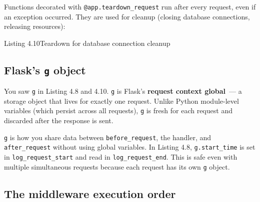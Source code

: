 Functions decorated with \texttt{@app.teardown\_request} run after every request, even if an exception occurred. They are used for cleanup (closing database connections, releasing resources):

\begin{codeboxcap}[short]{\textcolor{accent}{Listing 4.10}\enspace Teardown for database connection cleanup}

\begin{Shaded}
\begin{Highlighting}[]
\OperatorTok{=}\NormalTok{, }\NormalTok{)}
      \NormalTok{:}
\end{Highlighting}
\end{Shaded}

\end{codeboxcap}

\subsection*{\texorpdfstring{Flask's \texttt{g} object}{Flask's g object}}\label{04-request-handling-paths:flasks-g-object}

You saw \texttt{g} in Listing 4.8 and 4.10. \texttt{g} is Flask's \textbf{request context global}~--- a storage object that lives for exactly one request. Unlike Python module-level variables (which persist across all requests), \texttt{g} is fresh for each request and discarded after the response is sent.

\texttt{g} is how you share data between \texttt{before\_request}, the handler, and \texttt{after\_request} without using global variables. In Listing 4.8, \texttt{g.start\_time} is set in \texttt{log\_request\_start} and read in \texttt{log\_request\_end}. This is safe even with multiple simultaneous requests because each request has its own \texttt{g} object.

\subsection*{The middleware execution order}\label{04-request-handling-paths:the-middleware-execution-order}

